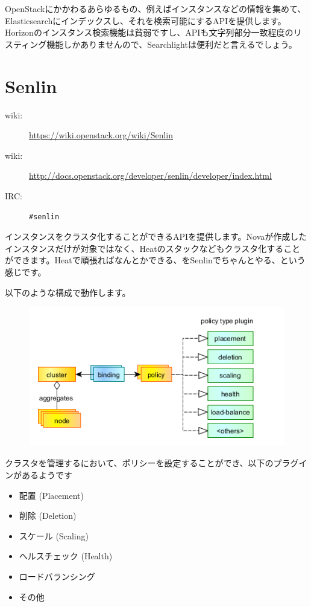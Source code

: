 OpenStackにかかわるあらゆるもの、例えばインスタンスなどの情報を集めて、Elasticsearchにインデックスし、それを検索可能にするAPIを提供します。Horizonのインスタンス検索機能は貧弱ですし、APIも文字列部分一致程度のリスティング機能しかありませんので、Searchlightは便利だと言えるでしょう。

\section{Senlin}

\begin{description}
	\item[wiki:] \url{https://wiki.openstack.org/wiki/Senlin}
	\item[wiki:] \url{http://docs.openstack.org/developer/senlin/developer/index.html}
	\item[IRC:] \verb|#senlin|
\end{description}

インスタンスをクラスタ化することができるAPIを提供します。Novaが作成したインスタンスだけが対象ではなく、Heatのスタックなどもクラスタ化することができます。Heatで頑張ればなんとかできる、をSenlinでちゃんとやる、という感じです。

以下のような構成で動作します。

\begin{figure}
	\includegraphics[width=\textwidth]{img/Senlin-policies.png}
\end{figure}

クラスタを管理するにおいて、ポリシーを設定することができ、以下のプラグインがあるようです

\begin{itemize}
	\item 配置 (Placement)
	\item 削除 (Deletion)
	\item スケール (Scaling)
	\item ヘルスチェック (Health)
	\item ロードバランシング
	\item その他
\end{itemize}

